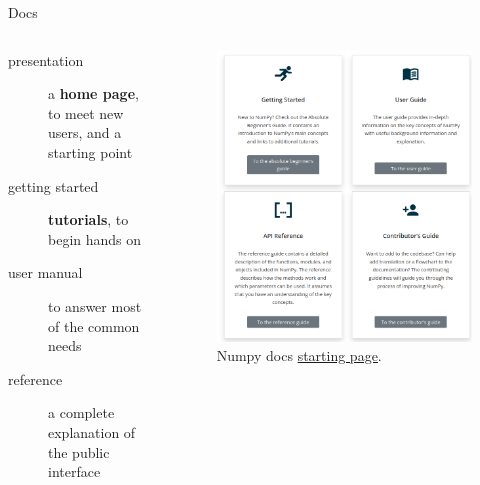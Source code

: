 \documentclass[9pt]{beamer}
\begin{document}
\begin{frame}{Docs}
\begin{columns}
\begin{column}{0.35\textwidth}
            \begin{description}
                \item[presentation] a \textbf{home page}, to meet new users,
                    and a starting point
                \item[getting started] \textbf{tutorials}, to begin hands on
                \item[user manual] to answer most of the common needs
                \item[reference] a complete explanation of the public interface
            \end{description}
        \end{column}

        \begin{column}{0.3\textwidth}
            \begin{figure}
                \centering
                \includegraphics[width=\textwidth]{numpy-hierarchical-docs}
                \caption{
                    Numpy docs \href{https://numpy.org/doc/stable/}{starting page}.
                }
            \end{figure}

        \end{column}
    \end{columns}
\end{frame}
\end{document}
